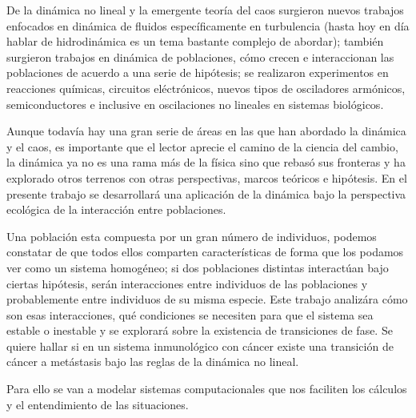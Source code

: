 \documentclass[11pt,a4paper]{article}
\begin{document}

De la dinámica no lineal y la emergente teoría del caos surgieron nuevos trabajos enfocados en dinámica de fluidos específicamente en turbulencia (hasta hoy en día hablar de hidrodinámica es un tema bastante complejo de abordar); también surgieron trabajos en dinámica de poblaciones, cómo crecen e interaccionan las poblaciones de acuerdo a una serie de hipótesis; se realizaron experimentos en reacciones químicas, circuitos eléctrónicos, nuevos tipos de osciladores armónicos, semiconductores e inclusive en oscilaciones no lineales en sistemas biológicos.

Aunque todavía hay una gran serie de áreas en las que han abordado la dinámica y el caos, es importante que el lector aprecie el camino de la ciencia del cambio, la dinámica ya no es una rama más de la física sino que rebasó sus fronteras y ha explorado otros terrenos con otras perspectivas, marcos teóricos e hipótesis. En el presente trabajo se desarrollará una aplicación de la dinámica bajo la perspectiva ecológica de la interacción entre poblaciones.

Una población esta compuesta por un gran número de individuos, podemos constatar de que todos ellos comparten características de forma que los podamos ver como un sistema homogéneo; si dos poblaciones distintas interactúan bajo ciertas hipótesis, serán interacciones entre individuos de las poblaciones y probablemente entre individuos de su misma especie. Este trabajo analizára cómo son esas interacciones, qué condiciones se necesiten para que el sistema sea estable o inestable y se explorará sobre la existencia de transiciones de fase. Se quiere hallar si en un sistema inmunológico con cáncer existe una transición de cáncer a metástasis bajo las reglas de la dinámica no lineal.

Para ello se van a modelar sistemas computacionales que nos faciliten los cálculos y el entendimiento de las situaciones.




\end{document}
